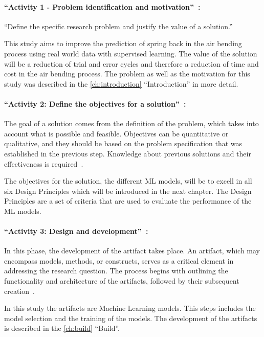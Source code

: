 \paragraph{``Activity 1 - Problem identification and motivation''~\cite[p. 52]{peffers2007design}:}
``Define the specific research problem and justify the value of a solution.''
~\cite[p. 52]{peffers2007design}

This study aims to improve the prediction of spring back in the air bending process using real world
data with supervised learning.
The value of the solution will be a reduction of trial and error cycles and therefore a reduction of time and cost in
the air bending process.
The problem as well as the motivation for this study was described in the \cref{ch:introduction}
``Introduction'' in more detail.

\paragraph{``Activity 2: Define the objectives for a solution''~\cite[p. 55]{peffers2007design}:}
The goal of a solution comes from the definition of the problem, which takes into account what is possible and feasible.
Objectives can be quantitative or qualitative, and they should be based on the problem specification that was
established in the previous step.
Knowledge about previous solutions and their effectiveness is required~\cite[p. 55]{peffers2007design}.

The objectives for the solution, the different \ac{ML} models, will be to excell in all six Design Principles which
will be introduced in the next chapter.
The Design Principles are a set of criteria that are used to evaluate the performance of the \ac{ML} models.

\paragraph{``Activity 3: Design and development''~\cite[p. 55]{peffers2007design}:}
In this phase, the development of the artifact takes place.
An artifact, which may encompass models, methods, or constructs, serves as a critical element in addressing the
research question.
The process begins with outlining the functionality and architecture of the artifacts, followed by their subsequent
creation~\cite[p. 55]{peffers2007design}.

In this study the artifacts are Machine Learning models.
This steps includes the model selection and the training of the models.
The development of the artifacts is described in the \cref{ch:build} ``Build''.

